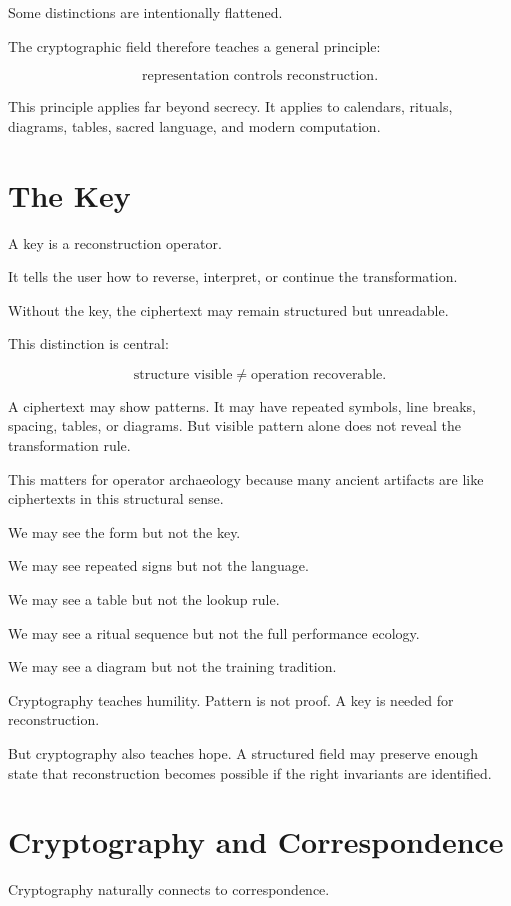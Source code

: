 \documentclass[11pt]{book}
\begin{document}
Some distinctions are intentionally flattened.

The cryptographic field therefore teaches a general principle:

\[
\text{representation controls reconstruction}.
\]

This principle applies far beyond secrecy. It applies to calendars, rituals, diagrams, tables, sacred language, and modern computation.

\section{The Key}

A key is a reconstruction operator.

It tells the user how to reverse, interpret, or continue the transformation.

Without the key, the ciphertext may remain structured but unreadable.

This distinction is central:

\[
\text{structure visible} \neq \text{operation recoverable}.
\]

A ciphertext may show patterns. It may have repeated symbols, line breaks, spacing, tables, or diagrams. But visible pattern alone does not reveal the transformation rule.

This matters for operator archaeology because many ancient artifacts are like ciphertexts in this structural sense.

We may see the form but not the key.

We may see repeated signs but not the language.

We may see a table but not the lookup rule.

We may see a ritual sequence but not the full performance ecology.

We may see a diagram but not the training tradition.

Cryptography teaches humility. Pattern is not proof. A key is needed for reconstruction.

But cryptography also teaches hope. A structured field may preserve enough state that reconstruction becomes possible if the right invariants are identified.

\section{Cryptography and Correspondence}

Cryptography naturally connects to correspondence.
\end{document}
